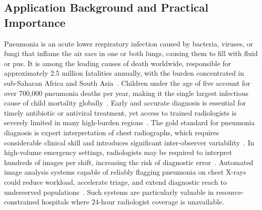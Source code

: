 \documentclass[preprint,12pt]{elsarticle}
\begin{document}
\subsection{Application Background and Practical Importance}
Pneumonia is an acute lower respiratory infection caused by bacteria,
viruses, or fungi that inflame the air sacs in one or both lungs,
causing them to fill with fluid or pus.
It is among the leading causes of death worldwide, responsible for
approximately 2.5 million fatalities annually, with the burden
concentrated in sub-Saharan Africa and South Asia~\cite{reshan2023}.
Children under the age of five account for over 700{,}000 pneumonia
deaths per year, making it the single largest infectious cause of child
mortality globally~\cite{liang2020}.
Early and accurate diagnosis is essential for timely antibiotic or
antiviral treatment, yet access to trained radiologists is severely
limited in many high-burden regions~\cite{rajpurkar2017chexnet}.
The gold standard for pneumonia diagnosis is expert interpretation of
chest radiographs, which requires considerable clinical skill and
introduces significant inter-observer variability~\cite{hashmi2020}.
In high-volume emergency settings, radiologists may be required to
interpret hundreds of images per shift, increasing the risk of
diagnostic error~\cite{chouhan2020}.
Automated image analysis systems capable of reliably flagging pneumonia
on chest X-rays could reduce workload, accelerate triage, and extend
diagnostic reach to underserved populations~\cite{rajpurkar2017chexnet}.
Such systems are particularly valuable in resource-constrained hospitals
where 24-hour radiologist coverage is unavailable.

\end{document}
